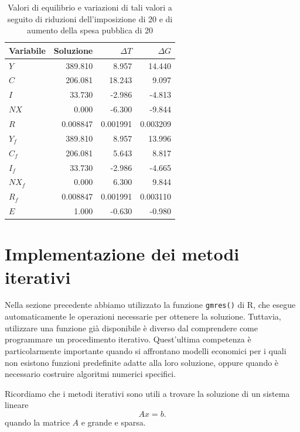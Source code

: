 \begin{table}
\small
\renewcommand{\arraystretch}{1.15}
\setlength{\tabcolsep}{9pt}
\centering
\begin{tabular}{lrrr}
\hline
\textbf{Variabile} &
\textbf{Soluzione} &
\textbf{$\Delta T$} &
\textbf{$\Delta G$} \\
\hline
$Y$    & 389.810 &  8.957 & 14.440 \\
$C$    & 206.081 & 18.243 &  9.097 \\
$I$    &  33.730 & -2.986 & -4.813 \\
$NX$   &   0.000 & -6.300 & -9.844 \\
$R$    & 0.008847 & 0.001991 & 0.003209 \\
$Y_f$  & 389.810 &  8.957 & 13.996 \\
$C_f$  & 206.081 &  5.643 &  8.817 \\
$I_f$  &  33.730 & -2.986 & -4.665 \\
$NX_f$ &   0.000 &  6.300 &  9.844 \\
$R_f$  & 0.008847 & 0.001991 & 0.003110 \\
$E$    &   1.000 & -0.630 & -0.980 \\
\hline
\end{tabular}
\caption{Valori di equilibrio e variazioni di tali valori a seguito di riduzioni dell'imposizione di 20 e di aumento della spesa pubblica di 20}
\label{tab:eqislm}
\end{table}


\section{Implementazione dei metodi iterativi}
\label{sec:implementazione-metodi-iterativi}


Nella sezione precedente abbiamo utilizzato la funzione
\texttt{gmres()} di R, che esegue automaticamente le operazioni necessarie per ottenere la soluzione. 
Tuttavia, utilizzare una funzione già disponibile
è diverso dal comprendere come programmare un procedimento
iterativo. Quest'ultima competenza è particolarmente
importante quando si affrontano modelli economici per i quali
non esistono funzioni predefinite adatte alla loro soluzione,
oppure quando è necessario costruire algoritmi numerici
specifici.

Ricordiamo che i metodi iterativi sono utili a trovare 
la soluzione di un sistema lineare
\begin{equation*}
    Ax=b.
\end{equation*}
quando la matrice $A$ e grande e sparsa.

